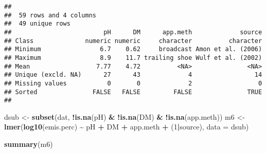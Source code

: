 \documentclass[
]{article}
\newenvironment{Shaded}{\begin{snugshade}}{\end{snugshade}}
\newcommand{\AttributeTok}[1]{\textcolor[rgb]{0.13,0.29,0.53}{#1}}
\newcommand{\DecValTok}[1]{\textcolor[rgb]{0.00,0.00,0.81}{#1}}
\newcommand{\FunctionTok}[1]{\textcolor[rgb]{0.13,0.29,0.53}{\textbf{#1}}}
\newcommand{\NormalTok}[1]{#1}
\newcommand{\OtherTok}[1]{\textcolor[rgb]{0.56,0.35,0.01}{#1}}
\newcommand{\SpecialCharTok}[1]{\textcolor[rgb]{0.81,0.36,0.00}{\textbf{#1}}}
\begin{document}
\begin{verbatim}
## 
##  59 rows and 4 columns
##  49 unique rows
##                         pH      DM      app.meth             source
## Class              numeric numeric     character          character
## Minimum                6.7    0.62     broadcast Amon et al. (2006)
## Maximum                8.9    11.7 trailing shoe Wulf et al. (2002)
## Mean                  7.77    4.72          <NA>               <NA>
## Unique (excld. NA)      27      43             4                 14
## Missing values           0       0             2                  0
## Sorted               FALSE   FALSE         FALSE               TRUE
## 
\end{verbatim}

\begin{Shaded}
\begin{Highlighting}[]
\NormalTok{dsub }\OtherTok{\textless{}{-}} \FunctionTok{subset}\NormalTok{(dat, }\SpecialCharTok{!}\FunctionTok{is.na}\NormalTok{(pH) }\SpecialCharTok{\&} \SpecialCharTok{!}\FunctionTok{is.na}\NormalTok{(DM) }\SpecialCharTok{\&} \SpecialCharTok{!}\FunctionTok{is.na}\NormalTok{(app.meth))}
\NormalTok{m6 }\OtherTok{\textless{}{-}} \FunctionTok{lmer}\NormalTok{(}\FunctionTok{log10}\NormalTok{(emis.perc) }\SpecialCharTok{\textasciitilde{}}\NormalTok{ pH }\SpecialCharTok{+}\NormalTok{ DM }\SpecialCharTok{+}\NormalTok{ app.meth }\SpecialCharTok{+}\NormalTok{ (}\DecValTok{1}\SpecialCharTok{|}\NormalTok{source), }\AttributeTok{data =}\NormalTok{ dsub)}
\end{Highlighting}
\end{Shaded}

\begin{Shaded}
\begin{Highlighting}[]
\FunctionTok{summary}\NormalTok{(m6)}
\end{Highlighting}
\end{Shaded}
\end{document}
